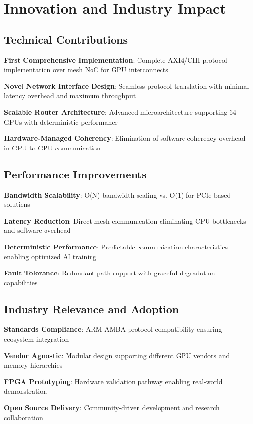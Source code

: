 \documentclass[11pt,a4paper]{article}
\begin{document}
\section{Innovation and Industry Impact}

\subsection{Technical Contributions}

\begin{techlist}
    \item \textbf{First Comprehensive Implementation}: Complete AXI4/CHI protocol implementation over mesh NoC for GPU interconnects
    \item \textbf{Novel Network Interface Design}: Seamless protocol translation with minimal latency overhead and maximum throughput
    \item \textbf{Scalable Router Architecture}: Advanced microarchitecture supporting 64+ GPUs with deterministic performance
    \item \textbf{Hardware-Managed Coherency}: Elimination of software coherency overhead in GPU-to-GPU communication
\end{techlist}

\subsection{Performance Improvements}

\begin{techlist}
    \item \textbf{Bandwidth Scalability}: O(N) bandwidth scaling vs. O(1) for PCIe-based solutions
    \item \textbf{Latency Reduction}: Direct mesh communication eliminating CPU bottlenecks and software overhead
    \item \textbf{Deterministic Performance}: Predictable communication characteristics enabling optimized AI training
    \item \textbf{Fault Tolerance}: Redundant path support with graceful degradation capabilities
\end{techlist}

\subsection{Industry Relevance and Adoption}

\begin{techlist}
    \item \textbf{Standards Compliance}: ARM AMBA protocol compatibility ensuring ecosystem integration
    \item \textbf{Vendor Agnostic}: Modular design supporting different GPU vendors and memory hierarchies
    \item \textbf{FPGA Prototyping}: Hardware validation pathway enabling real-world demonstration
    \item \textbf{Open Source Delivery}: Community-driven development and research collaboration
\end{techlist}
\end{document}
